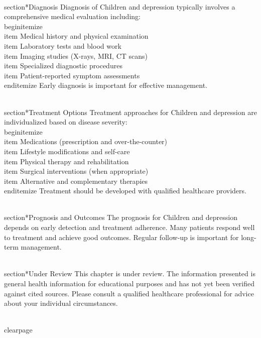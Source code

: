 \\section*{Diagnosis}
Diagnosis of Children and depression typically involves a comprehensive medical evaluation including:
\\begin{itemize}
  \\item Medical history and physical examination
  \\item Laboratory tests and blood work
  \\item Imaging studies (X-rays, MRI, CT scans)
  \\item Specialized diagnostic procedures
  \\item Patient-reported symptom assessments
\\end{itemize}
Early diagnosis is important for effective management.

\\section*{Treatment Options}
Treatment approaches for Children and depression are individualized based on disease severity:
\\begin{itemize}
  \\item Medications (prescription and over-the-counter)
  \\item Lifestyle modifications and self-care
  \\item Physical therapy and rehabilitation
  \\item Surgical interventions (when appropriate)
  \\item Alternative and complementary therapies
\\end{itemize}
Treatment should be developed with qualified healthcare providers.

\\section*{Prognosis and Outcomes}
The prognosis for Children and depression depends on early detection and treatment adherence. Many patients respond well to treatment and achieve good outcomes. Regular follow-up is important for long-term management.

\\section*{Under Review}
This chapter is under review. The information presented is general health information for educational purposes and has not yet been verified against cited sources. Please consult a qualified healthcare professional for advice about your individual circumstances.

\\clearpage
